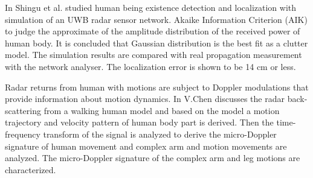 




 In \cite{Shingu2008} Shingu et al. studied human being existence detection and localization with simulation of an UWB radar sensor network. Akaike Information Criterion (AIK) to judge the approximate of the amplitude distribution of the received power of human body. It is concluded that Gaussian distribution is the best fit as a clutter model. The simulation results are compared with real propagation measurement with the network analyser. The localization error is shown to be 14 cm or less.

Radar returns from human with motions are subject to Doppler modulations that provide
information about motion dynamics. In \cite{VChenHuman} V.Chen discusses the radar back-scattering from a walking human model and based on the model a motion trajectory and velocity pattern of human body part is derived. Then the time-frequency transform of the signal is analyzed to derive the micro-Doppler signature of human movement and complex arm and motion movements are analyzed. The micro-Doppler signature of the complex arm and leg motions are characterized.

